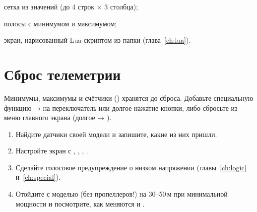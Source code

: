 \begin{description}[font=\sffamily\bfseries\color{etx}]
  \item[Nums] сетка из значений (до 4 строк × 3 столбца);
  \item[Bars] полосы с минимумом и максимумом;
  \item[Script] экран, нарисованный Lua-скриптом из папки 
        (глава~\ref{ch:lua}).
\end{description}

\begin{center}
\end{center}

\section{Сброс телеметрии}

Минимумы, максимумы и счётчики () хранятся до сброса. Добавьте специальную функцию
 →  на переключатель или долгое нажатие кнопки, либо
сбросьте из меню главного экрана (долгое  → ).

\begin{tasks}
\begin{enumerate}
  \item Найдите датчики своей модели и запишите, какие из них пришли.
  \item Настройте экран  с , , , .
  \item Сделайте голосовое предупреждение о низком напряжении (главы~\ref{ch:logic}
        и~\ref{ch:special}).
  \item Отойдите с моделью (без пропеллеров!) на 30--50\,м при минимальной мощности и
        посмотрите, как меняются  и .
\end{enumerate}
\end{tasks}
